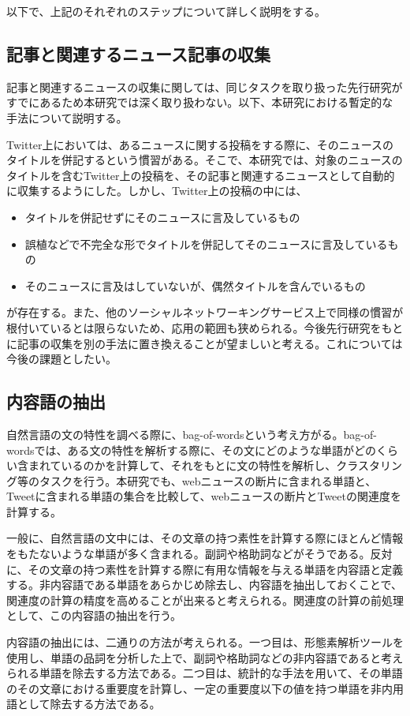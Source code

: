 \documentclass[12pt]{jarticle}
\begin{document}
以下で、上記のそれぞれのステップについて詳しく説明をする。

\subsection{記事と関連するニュース記事の収集}
記事と関連するニュースの収集に関しては、同じタスクを取り扱った先行研究がすでにあるため本研究では深く取り扱わない。以下、本研究における暫定的な手法について説明する。

Twitter上においては、あるニュースに関する投稿をする際に、そのニュースのタイトルを併記するという慣習がある。そこで、本研究では、対象のニュースのタイトルを含むTwitter上の投稿を、その記事と関連するニュースとして自動的に収集するようにした。しかし、Twitter上の投稿の中には、

\begin{itemize}
  \item タイトルを併記せずにそのニュースに言及しているもの
  \item 誤植などで不完全な形でタイトルを併記してそのニュースに言及しているもの
  \item そのニュースに言及はしていないが、偶然タイトルを含んでいるもの
\end{itemize}
が存在する。また、他のソーシャルネットワーキングサービス上で同様の慣習が根付いているとは限らないため、応用の範囲も狭められる。今後先行研究をもとに記事の収集を別の手法に置き換えることが望ましいと考える。これについては今後の課題としたい。

\subsection{内容語の抽出}
自然言語の文の特性を調べる際に、bag-of-words\cite{nlpml}という考え方がる。bag-of-wordsでは、ある文の特性を解析する際に、その文にどのような単語がどのくらい含まれているのかを計算して、それをもとに文の特性を解析し、クラスタリング等のタスクを行う。本研究でも、webニュースの断片に含まれる単語と、Tweetに含まれる単語の集合を比較して、webニュースの断片とTweetの関連度を計算する。

一般に、自然言語の文中には、その文章の持つ素性を計算する際にほとんど情報をもたないような単語が多く含まれる。副詞や格助詞などがそうである。反対に、その文章の持つ素性を計算する際に有用な情報を与える単語を内容語と定義する。非内容語である単語をあらかじめ除去し、内容語を抽出しておくことで、関連度の計算の精度を高めることが出来ると考えられる。関連度の計算の前処理として、この内容語の抽出を行う。

内容語の抽出には、二通りの方法が考えられる。一つ目は、形態素解析ツールを使用し、単語の品詞を分析した上で、副詞や格助詞などの非内容語であると考えられる単語を除去する方法である。二つ目は、統計的な手法を用いて、その単語のその文章における重要度を計算し、一定の重要度以下の値を持つ単語を非内用語として除去する方法である。
\end{document}
